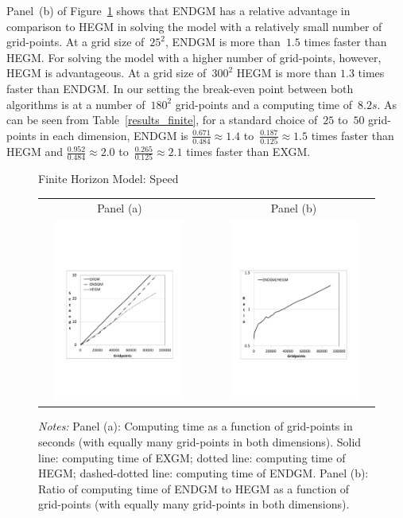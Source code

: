 \documentclass[a4paper,12pt]{article}
\begin{document}
Panel~(b) of Figure~\ref{graph_finte} shows that ENDGM has a relative advantage in comparison to HEGM in solving the model with a relatively small number of grid-points. At a grid size of~$25^{2}$, ENDGM is more than~$1.5$ times faster than HEGM. For solving the model with a higher number of grid-points, however, HEGM is advantageous. At a grid size of~$300^{2}$ HEGM is more than $1.3$ times faster than ENDGM. In our setting the break-even point between both algorithms is at a number of~$180^{2}$ grid-points and a computing time of~$8.2s$. As can be seen from Table~\ref{results_finite}, for a standard choice of~$25$ to~$50$ grid-points in each dimension, ENDGM is $\frac{0.671} {0.484} \approx 1.4$ to~$\frac{0.187} {0.125} \approx 1.5$ times faster than HEGM and $\frac{0.952} {0.484} \approx 2.0$ to~$\frac{0.265} {0.125} \approx 2.1$ times faster than EXGM.
\begin{figure}[htbp]
	\caption{Finite Horizon Model: Speed}
	\label{graph_finte}
	\centering
	\begin{tabular}{cC{1cm}c}
	Panel (a) & & Panel (b)\\
	\includegraphics[height=6.0cm, width=6.0cm]{Abbildungen/Seconds_Finite.pdf} & & \includegraphics[height=6.0cm, width=6.0cm]{Abbildungen/Ratio_Finite.pdf} \\
	\end{tabular}
	\caption*{\footnotesize{\emph{Notes:} Panel (a): Computing time as a function of grid-points in seconds (with equally many grid-points in both dimensions). Solid line: computing time of EXGM; dotted line: computing time of HEGM; dashed-dotted line: computing time of ENDGM. Panel (b): Ratio of computing time of ENDGM to HEGM as a function of grid-points (with equally many grid-points in both dimensions).}}
\end{figure}
\end{document}
